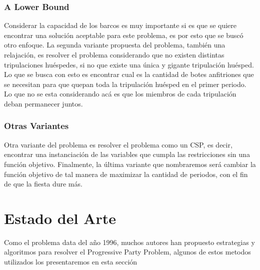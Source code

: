 \documentclass[spanish, fleqn]{article}
\begin{document}
 
 \newpage
 
\subsubsection*{A Lower Bound~\cite{Smith1996}}

Considerar la capacidad de los barcos es muy importante si es que se quiere encontrar una solución aceptable para este problema, es por esto que se buscó otro enfoque. La segunda variante propuesta del problema, también una relajación, es resolver el problema considerando que no existen distintas tripulaciones huéspedes, si no que existe una única y gigante tripulación huésped. Lo que se busca con esto es encontrar cual es la cantidad de botes anfitriones que se necesitan para que quepan toda la tripulación huésped en el primer periodo. Lo que no se esta considerando acá es que los miembros de cada tripulación deban permanecer juntos.

\subsubsection*{Otras Variantes~\cite{Smith1996}}

Otra variante del problema es resolver el problema como un CSP, es decir, encontrar una instanciación de las variables que cumpla las restricciones sin una función objetivo. Finalmente, la última variante que nombraremos será cambiar la función objetivo de tal manera de maximizar la cantidad de periodos, con el fin de que la fiesta dure más.


\section*{Estado del Arte}

Como el problema data del año 1996, muchos autores han propuesto estrategias y algoritmos para resolver el Progressive Party Problem, algunos de estos metodos utilizados los presentaremos en esta sección
\end{document}
